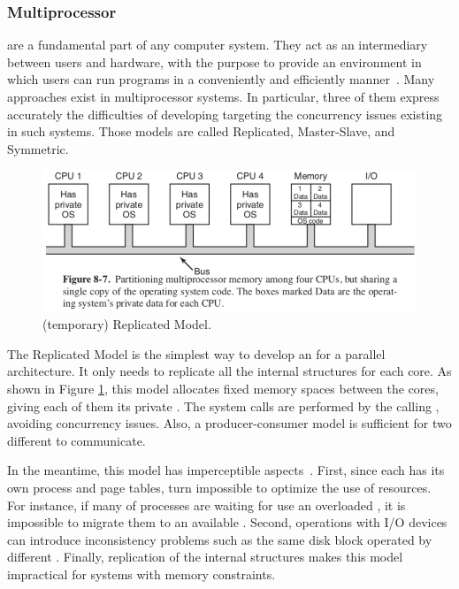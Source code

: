 		\subsubsection{Multiprocessor \oses}
		\label{sec.multiprocessor_os}

			\oses are a fundamental part of any computer system.
			They act as an intermediary between users and hardware, with the
			purpose to provide an environment in which users can run programs
			in a conveniently and efficiently manner~\cite{Abraham: book}.
			Many \os approaches exist in multiprocessor systems.
			In particular, three of them express accurately the difficulties
			of developing \oses targeting the concurrency issues existing in
			such systems.
			Those models are called Replicated, Master-Slave, and Symmetric.

			\begin{figure}[h]
				\centering
				\includegraphics[width=.8\textwidth]{images/replicated-os.png}

				\caption{
					(temporary) Replicated \os Model.
				}\par
				\label{fig.replicated_os}
			\end{figure}

			The Replicated Model is the simplest way to develop an \os for a
			parallel architecture.
			It only needs to replicate all the internal \os structures for each core.
			As shown in Figure \ref{fig.replicated_os}, this model allocates fixed memory spaces
			between the cores, giving each of them its private \os.
			The system calls are performed by the calling \cpu, avoiding concurrency issues.
			Also, a producer-consumer model is sufficient for two different \cpus to communicate.

			In the meantime, this model has imperceptible aspects~\cite{tanenbaum:4ed}.
			First, since each \cpu has its own process and page tables, turn impossible
			to optimize the use of resources.
			For instance, if many of processes are waiting for use an overloaded \cpu,
			it is impossible to migrate them to an available \cpu.
			Second, operations with I/O devices can introduce inconsistency problems
			such as the same disk block operated by different \cpus.
			Finally, replication of the internal \os structures makes this model
			impractical for systems with memory constraints.

